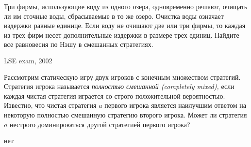 \begin{problem}[Экология]
\begin{source}
\cite{gintis:gte}\end{source}
Три фирмы, использующие воду из одного озера, одновременно решают, очищать ли им сточные воды, сбрасываемые в то же озеро. Очистка воды означает издержки равные единице. Если воду не очищают две или три фирмы, то каждая из трех фирм несет дополнительные издержки в размере трех единиц.
Найдите все равновесия по Нэшу в смешанных стратегиях.



\begin{sol}

\end{sol}
\end{problem}







\begin{problem}
\begin{source}
LSE exam, 2002
\end{source}
 Рассмотрим статическую игру двух игроков с конечным множеством стратегий. Стратегия игрока называется {\it полностью смешанной (completely mixed),} если каждая чистая стратегия играется со строго положительной вероятностью. Известно, что чистая стратегия  $a$  первого игрока является наилучшим ответом на некоторую полностью смешанную стратегию второго игрока.
Может ли стратегия  $a$  нестрого доминироваться другой стратегией первого игрока?




\begin{sol}
нет
\end{sol}
\end{problem}






